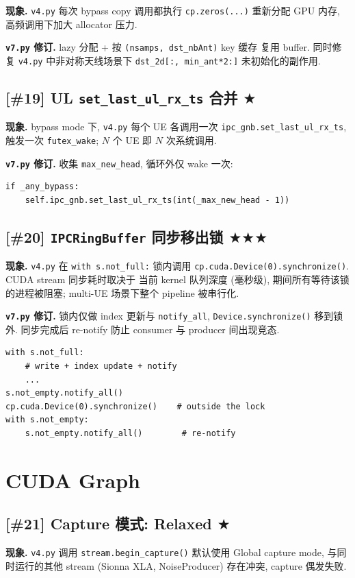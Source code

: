 \documentclass[11pt,a4paper,UTF8,fontset=fandol]{ctexart}
\newcommand{\sone}{\textcolor{starcolor}{$\bigstar$}}
\newcommand{\sthree}{\textcolor{starcolor}{$\bigstar\bigstar\bigstar$}}
\newcommand{\vfour}{\texttt{v4.py}}
\newcommand{\vseven}{\texttt{v7.py}}
\newcommand{\bugitem}[3]{%
  \subsection{[\##1] #2 \hfill #3}%
  \vspace{-0.5em}%
}
\begin{document}
\textbf{现象.} \vfour{} 每次 bypass copy 调用都执行 \texttt{cp.zeros(...)} 重新分配
GPU 内存, 高频调用下加大 allocator 压力.

\textbf{\vseven{} 修订.} lazy 分配 + 按 \texttt{(nsamps, dst\_nbAnt)} key 缓存
复用 buffer. 同时修复 \vfour{} 中非对称天线场景下
\texttt{dst\_2d[:, min\_ant*2:]} 未初始化的副作用.

\bugitem{19}{UL \texttt{set\_last\_ul\_rx\_ts} 合并}{\sone}

\textbf{现象.} bypass mode 下, \vfour{} 每个 UE 各调用一次
\texttt{ipc\_gnb.set\_last\_ul\_rx\_ts}, 触发一次 \texttt{futex\_wake};
$N$ 个 UE 即 $N$ 次系统调用.

\textbf{\vseven{} 修订.} 收集 \texttt{max\_new\_head}, 循环外仅 wake 一次:
\begin{verbatim}
if _any_bypass:
    self.ipc_gnb.set_last_ul_rx_ts(int(_max_new_head - 1))
\end{verbatim}

\bugitem{20}{\texttt{IPCRingBuffer} 同步移出锁}{\sthree}

\textbf{现象.} \vfour{} 在 \texttt{with s.not\_full:} 锁内调用
\texttt{cp.cuda.Device(0).synchronize()}. CUDA stream 同步耗时取决于
当前 kernel 队列深度 (毫秒级), 期间所有等待该锁的进程被阻塞;
multi-UE 场景下整个 pipeline 被串行化.

\textbf{\vseven{} 修订.} 锁内仅做 index 更新与 \texttt{notify\_all},
\texttt{Device.synchronize()} 移到锁外. 同步完成后 re-notify
防止 consumer 与 producer 间出现竞态.
\begin{verbatim}
with s.not_full:
    # write + index update + notify
    ...
s.not_empty.notify_all()
cp.cuda.Device(0).synchronize()    # outside the lock
with s.not_empty:
    s.not_empty.notify_all()        # re-notify
\end{verbatim}

\section{CUDA Graph}
\label{sec:cudagraph}

\bugitem{21}{Capture 模式: Relaxed}{\sone}

\textbf{现象.} \vfour{} 调用 \texttt{stream.begin\_capture()} 默认使用
Global capture mode, 与同时运行的其他 stream (Sionna XLA, NoiseProducer)
存在冲突, capture 偶发失败.
\end{document}
